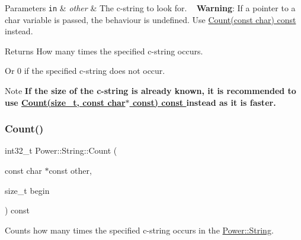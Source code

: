 \begin{DoxyParams}[1]{Parameters}
\mbox{\tt in}  & {\em other} & The c-\/string to look for. ~\newline
 {\bfseries Warning}\+: If a pointer to a char variable is passed, the behaviour is undefined. Use \hyperlink{class_power_1_1_string_aa05ff2dca9ccc4e7f3fe699b0e83edd7}{Count(const char) const }instead. \\
\hline
\end{DoxyParams}
\begin{DoxyReturn}{Returns}
How many times the specified c-\/string occurs. 

Or 0 if the specified c-\/string does not occur. 
\end{DoxyReturn}
\begin{DoxyNote}{Note}
{\bfseries If the size of the c-\/string is already known, it is recommended to use \hyperlink{class_power_1_1_string_ad1e26d91a1ea62ca5a710740a1afdaa2}{Count(size\+\_\+t, const char$\ast$ const) const }instead as it is faster.} 
\end{DoxyNote}
\mbox{\label{class_power_1_1_string_ae852f7d9f1ef1893b921bf04a8dc8ad8}} 
\subsubsection{\texorpdfstring{Count()}{Count()}\hspace{0.1cm}{\footnotesize\ttfamily [5/12]}}
{\footnotesize\ttfamily int32\+\_\+t Power\+::\+String\+::\+Count (\begin{DoxyParamCaption}\item[{const char $\ast$const}]{other,  }\item[{size\+\_\+t}]{begin }\end{DoxyParamCaption}) const\hspace{0.3cm}{\ttfamily [inline]}}



Counts how many times the specified c-\/string occurs in the \hyperlink{class_power_1_1_string}{Power\+::\+String}. 


